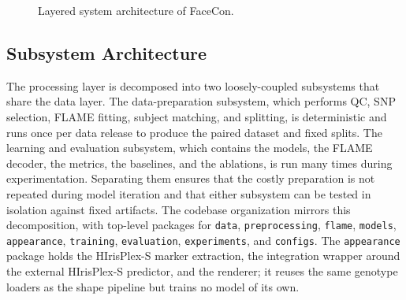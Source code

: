 \begin{figure}[!ht]
\centering
{}
\caption{Layered system architecture of FaceCon.}
\label{fig:arch}
\end{figure}

\subsection{Subsystem Architecture}
The processing layer is decomposed into two loosely-coupled subsystems that share the data layer. The data-preparation subsystem, which performs QC, SNP selection, FLAME fitting, subject matching, and splitting, is deterministic and runs once per data release to produce the paired dataset and fixed splits. The learning and evaluation subsystem, which contains the models, the FLAME decoder, the metrics, the baselines, and the ablations, is run many times during experimentation. Separating them ensures that the costly preparation is not repeated during model iteration and that either subsystem can be tested in isolation against fixed artifacts. The codebase organization mirrors this decomposition, with top-level packages for \texttt{data}, \texttt{preprocessing}, \texttt{flame}, \texttt{models}, \texttt{appearance}, \texttt{training}, \texttt{evaluation}, \texttt{experiments}, and \texttt{configs}. The \texttt{appearance} package holds the HIrisPlex-S marker extraction, the integration wrapper around the external HIrisPlex-S predictor, and the renderer; it reuses the same genotype loaders as the shape pipeline but trains no model of its own.

